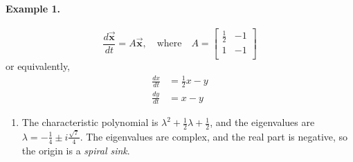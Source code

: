 \documentclass{book}
\newcommand{\BX}{\vec{\textbf{x}}}
\begin{document}
\paragraph{Example 1.}
\[
  \frac{d\BX}{dt} = A \BX, \quad \textrm{where} \quad
    A = \begin{bmatrix}
                   \frac{1}{2} & -1 \\
		   1 & -1 \\
        \end{bmatrix}
\]
or equivalently,
\[
\begin{split}
   \frac{dx}{dt} & = \frac{1}{2} x - y \\
   \frac{dy}{dt} & = x - y
\end{split}
\]
\begin{enumerate}
\item
The characteristic polynomial is $\lambda^2 +\frac{1}{2}\lambda+\frac{1}{2}$,
and the eigenvalues are
$\lambda = -\frac{1}{4}\pm i \frac{\sqrt{7}}{4}$.
The eigenvalues are complex,
and the real part is negative,
so the origin is a \emph{spiral sink}.


\end{enumerate}
\end{document}
